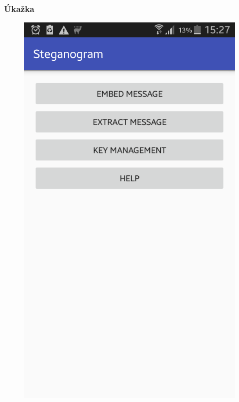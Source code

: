 \documentclass{beamer}
\begin{document}
\begin{frame}
    \frametitle{Úkažka}
    \begin{figure}
    \centerline{\includegraphics[height=0.8 \textheight]{images/screen_1.png}}
    
    \end{figure}
\end{frame}
\end{document}
